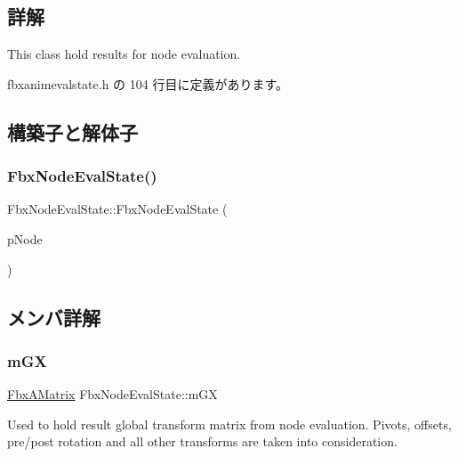 \subsection{詳解}
This class hold results for node evaluation. 

 fbxanimevalstate.\+h の 104 行目に定義があります。



\subsection{構築子と解体子}
\mbox{\label{class_fbx_node_eval_state_af0a429632794570efff26a30fc94b5e0}} 
\subsubsection{\texorpdfstring{Fbx\+Node\+Eval\+State()}{FbxNodeEvalState()}}
{\footnotesize\ttfamily Fbx\+Node\+Eval\+State\+::\+Fbx\+Node\+Eval\+State (\begin{DoxyParamCaption}\item[{\hyperlink{class_fbx_node}{Fbx\+Node} $\ast$}]{p\+Node }\end{DoxyParamCaption})}



\subsection{メンバ詳解}
\mbox{\label{class_fbx_node_eval_state_a28e9c56c4abd928db69ea10e46656994}} 
\subsubsection{\texorpdfstring{m\+GX}{mGX}}
{\footnotesize\ttfamily \hyperlink{class_fbx_a_matrix}{Fbx\+A\+Matrix} Fbx\+Node\+Eval\+State\+::m\+GX}



Used to hold result global transform matrix from node evaluation. Pivots, offsets, pre/post rotation and all other transforms are taken into consideration. 



